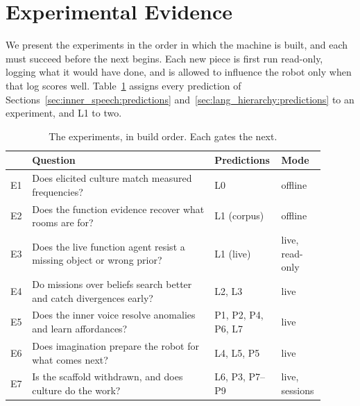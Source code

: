 %

\section{Experimental Evidence}
\label{sec:experiments}

We present the experiments in the order in which the machine is built, and each must succeed before the next
begins. Each new piece is first run read-only, logging what it would have done, and is allowed to influence the
robot only when that log scores well. Table~\ref{tab:exp_overview} assigns every prediction of
Sections~\ref{sec:inner_speech:predictions} and~\ref{sec:lang_hierarchy:predictions} to an experiment, and L1 to two.

\begin{table}[!htb]
    \centering
    \small
    \begin{tabular}{|>{\raggedright\arraybackslash}p{0.04\linewidth}|>{\raggedright\arraybackslash}p{0.56\linewidth}|>{\raggedright\arraybackslash}p{0.17\linewidth}|>{\raggedright\arraybackslash}p{0.13\linewidth}|}
        \hline
        & \textbf{Question} & \textbf{Predictions} & \textbf{Mode} \\ \hline
        E1 & Does elicited culture match measured frequencies? & L0 & offline \\ \hline
        E2 & Does the function evidence recover what rooms are for? & L1 (corpus) & offline \\ \hline
        E3 & Does the live function agent resist a missing object or wrong prior? & L1 (live) & live, read-only \\ \hline
        E4 & Do missions over beliefs search better and catch divergences early? & L2, L3 & live \\ \hline
        E5 & Does the inner voice resolve anomalies and learn affordances? & P1, P2, P4, P6, L7 & live \\ \hline
        E6 & Does imagination prepare the robot for what comes next? & L4, L5, P5 & live \\ \hline
        E7 & Is the scaffold withdrawn, and does culture do the work? & L6, P3, P7--P9 & live, sessions \\ \hline
    \end{tabular}
    \caption{The experiments, in build order. Each gates the next.}
    \label{tab:exp_overview}
\end{table}

